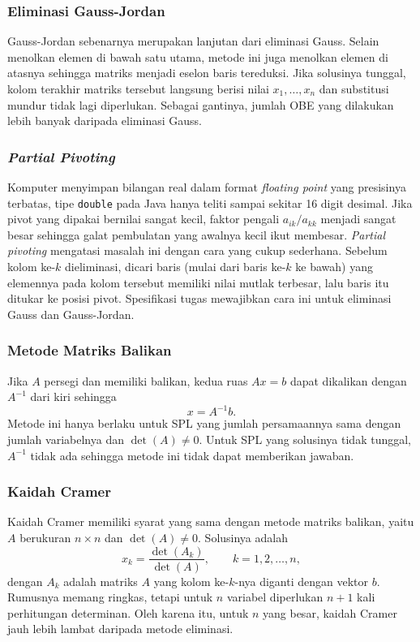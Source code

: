 \subsubsection{Eliminasi Gauss-Jordan}

Gauss-Jordan sebenarnya merupakan lanjutan dari eliminasi Gauss. Selain menolkan elemen di bawah satu utama, metode ini juga menolkan elemen di atasnya sehingga matriks menjadi eselon baris tereduksi. Jika solusinya tunggal, kolom terakhir matriks tersebut langsung berisi nilai $x_1, \dots, x_n$ dan substitusi mundur tidak lagi diperlukan. Sebagai gantinya, jumlah OBE yang dilakukan lebih banyak daripada eliminasi Gauss.

\subsubsection{\textit{Partial Pivoting}}

Komputer menyimpan bilangan real dalam format \textit{floating point} yang presisinya terbatas, tipe \texttt{double} pada Java hanya teliti sampai sekitar 16 digit desimal. Jika pivot yang dipakai bernilai sangat kecil, faktor pengali $a_{ik}/a_{kk}$ menjadi sangat besar sehingga galat pembulatan yang awalnya kecil ikut membesar. \textit{Partial pivoting} mengatasi masalah ini dengan cara yang cukup sederhana. Sebelum kolom ke-$k$ dieliminasi, dicari baris (mulai dari baris ke-$k$ ke bawah) yang elemennya pada kolom tersebut memiliki nilai mutlak terbesar, lalu baris itu ditukar ke posisi pivot. Spesifikasi tugas mewajibkan cara ini untuk eliminasi Gauss dan Gauss-Jordan.

\subsubsection{Metode Matriks Balikan}

Jika $A$ persegi dan memiliki balikan, kedua ruas $Ax = b$ dapat dikalikan dengan $A^{-1}$ dari kiri sehingga
\[
x = A^{-1} b .
\]
Metode ini hanya berlaku untuk SPL yang jumlah persamaannya sama dengan jumlah variabelnya dan $\det(A) \neq 0$. Untuk SPL yang solusinya tidak tunggal, $A^{-1}$ tidak ada sehingga metode ini tidak dapat memberikan jawaban.

\subsubsection{Kaidah Cramer}

Kaidah Cramer memiliki syarat yang sama dengan metode matriks balikan, yaitu $A$ berukuran $n \times n$ dan $\det(A) \neq 0$. Solusinya adalah
\[
x_k = \frac{\det(A_k)}{\det(A)}, \qquad k = 1, 2, \dots, n,
\]
dengan $A_k$ adalah matriks $A$ yang kolom ke-$k$-nya diganti dengan vektor $b$. Rumusnya memang ringkas, tetapi untuk $n$ variabel diperlukan $n+1$ kali perhitungan determinan. Oleh karena itu, untuk $n$ yang besar, kaidah Cramer jauh lebih lambat daripada metode eliminasi.

